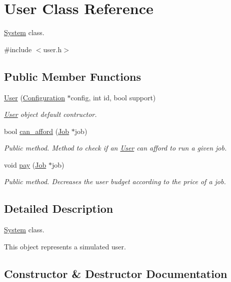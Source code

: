 \hypertarget{classUser}{}\section{User Class Reference}
\label{classUser}


\hyperlink{classSystem}{System} class.  




{\ttfamily \#include $<$user.\+h$>$}

\subsection*{Public Member Functions}
\begin{DoxyCompactItemize}
\item 
\hyperlink{classUser_a9ee57fd1e1dca94a043ad0f5a99ac2be}{User} (\hyperlink{classConfiguration}{Configuration} $\ast$config, int id, bool support)
\begin{DoxyCompactList}\small\item\em \hyperlink{classUser}{User} object default contructor. \end{DoxyCompactList}\item 
bool \hyperlink{classUser_a256c7f780ea27a728b2bf391e0925728}{can\+\_\+afford} (\hyperlink{classJob}{Job} $\ast$job)
\begin{DoxyCompactList}\small\item\em Public method. Method to check if an \hyperlink{classUser}{User} can afford to run a given job. \end{DoxyCompactList}\item 
void \hyperlink{classUser_ab960fea4dd1f6ea2439e410fb8cfd9bc}{pay} (\hyperlink{classJob}{Job} $\ast$job)
\begin{DoxyCompactList}\small\item\em Public method. Decreases the user budget according to the price of a job. \end{DoxyCompactList}\end{DoxyCompactItemize}


\subsection{Detailed Description}
\hyperlink{classSystem}{System} class. 

This object represents a simulated user. 

\subsection{Constructor \& Destructor Documentation}
